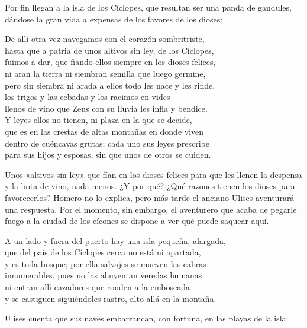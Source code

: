 Por fin llegan a la isla de los Cíclopes, que resultan ser una panda de gandules, dándose la gran vida a expensas de los favores de los dioses:

\begin{versocita}
De allí otra vez navegamos con el corazón sombritriste,\\
hasta que a patria de unos altivos sin ley, de los Cíclopes,\\
fuimos a dar, que fiando ellos siempre en los dioses felices,\\
ni aran la tierra ni siembran semilla que luego germine,\\
pero sin siembra ni arada a ellos todo les nace y les rinde,\\
los trigos y las cebadas y los racimos en vides\\
llenos de vino que Zeus con su lluvia les infla y bendice.\\
Y leyes ellos no tienen, ni plaza en la que se decide,\\
que es en las crestas de altas montañas en donde viven\\
dentro de cuéncavas grutas; cada uno sus leyes prescribe\\
para sus hijos y esposas, sin que unos de otros se cuiden.
\end{versocita}

Unos «altivos sin ley» que fían en los dioses felices para que les llenen la despensa y la bota de vino, nada menos. ¿Y por qué? ¿Qué razones tienen los dioses para favorecerlos? Homero no lo explica, pero más tarde el anciano Ulises aventurará una respuesta. Por el momento, sin embargo, el aventurero que acaba de pegarle fuego a la ciudad de los cícones se dispone a ver qué puede saquear aquí.

\begin{versocita}
A un lado y fuera del puerto hay una isla pequeña, alargada,\\
que del país de los Cíclopes cerca no está ni apartada,\\
y es toda bosque; por ella salvajes se mueven las cabras\\
innumerables, pues no las ahuyentan veredas humanas\\
ni entran allí cazadores que ronden a la emboscada\\
y se castiguen siguiéndoles rastro, alto allá en la montaña.
\end{versocita}

Ulises cuenta que sus naves embarrancan, con fortuna, en las playas de la isla:

